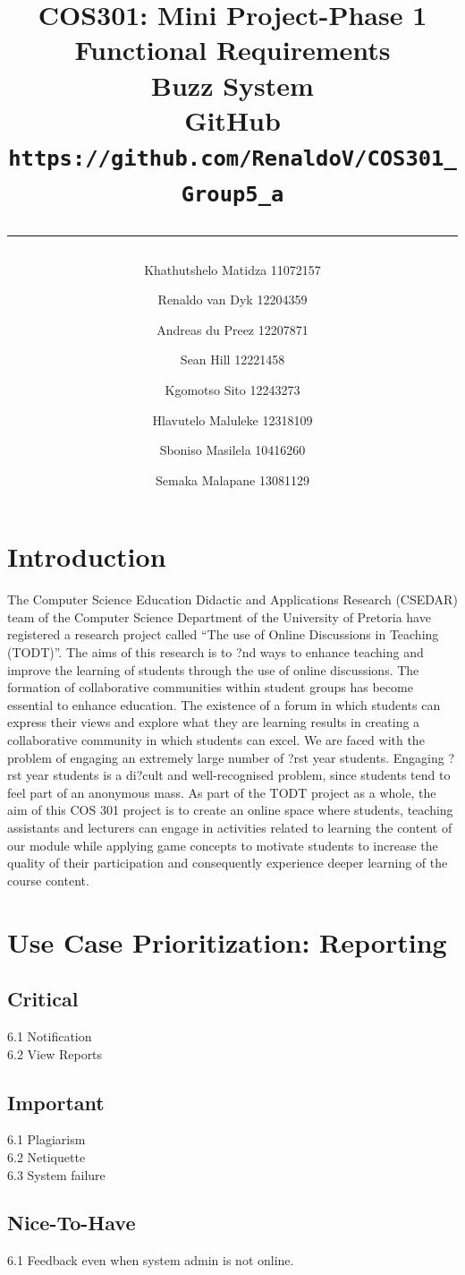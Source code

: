 \documentclass{scrreprt}
\title
{%
\author
{
Khathutshelo Matidza 11072157\\
\and
Renaldo van Dyk 12204359\\
\and
Andreas du Preez 12207871\\
\and
Sean Hill 12221458\\
\and
Kgomotso Sito 12243273\\
\and
Hlavutelo Maluleke 12318109\\
\and
Sboniso Masilela 10416260\\
\and
Semaka Malapane 13081129\\
}	
\centering
\vspace{2cm}
\huge{COS301: Mini Project-Phase 1\\Functional Requirements}\\
\vspace{2cm}
Buzz System\\
\vspace{2cm}
GitHub\\
\LARGE\texttt{https://github.com/RenaldoV/COS301\_Group5\_a}
\vfill
\vspace{1cm}
\rule{15cm}{2pt}
}
\date
{}
\begin{document}
\maketitle
\tableofcontents
\chapter{Introduction}
The Computer Science Education Didactic and Applications Research (CSEDAR) team of the Computer Science Department of the University of Pretoria have registered a research project called “The use of Online Discussions in Teaching (TODT)”. The aims of this research is to ?nd ways to enhance teaching and improve the learning of students through the use of online discussions. The formation of collaborative communities within student groups has become essential to enhance education. The existence of a forum in which students can express their views and explore what they are learning results in creating a collaborative community in which students can excel. We are faced with the problem of engaging an extremely large number of ?rst year students. Engaging ?rst year students is a di?cult and well-recognised problem, since students tend to feel part of an anonymous mass. As part of the TODT project as a whole, the aim of this COS 301 project is to create an online space where students, teaching assistants and lecturers can engage in activities related to learning the content of our module while applying game concepts to motivate students to increase the quality of their participation and consequently experience deeper learning of the course content.
\\
\chapter{Use Case Prioritization: Reporting}

\section{Critical}
6.1 Notification\\
6.2 View Reports\\
\section{Important}
6.1 Plagiarism\\
6.2 Netiquette\\
6.3 System failure\\
\section{Nice-To-Have}
6.1 Feedback even when system admin is not online.\\
\end{document}
